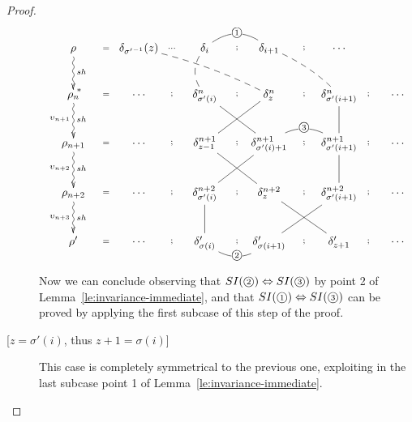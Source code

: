 \documentclass{llncs}
\newcommand{\cycl}[1]{\ensuremath{\mbox{\textcircled{\scriptsize{$#1$}}}}}
\renewcommand{\iff}{\ensuremath{\Leftrightarrow}}
\begin{document}
\begin{proof}
\begin{description}
$$\xymatrix@C=2pc@R=2pc{
 \rho  \ar@{~>}[d]^{sh}^(.9){*} \ar@{}[r]|{=} &
   \delta_{{\sigma'}^{-1}}(z)  \ar@{--}@/^1ex/[drr]   \ar@{}[r]|{\cdots}  &
    \delta_i \ar@{--}@/_2ex/[d]  \ar@{}[r]|{;} \ar@{-}@/^3ex/[r]|{\cycl{1}} &
    \delta_{i+1} \ar@{--}@/^1ex/[dr]  \ar@{}[r]|{;}  & \cdots\\
\rho_n  \ar@{~>}[d]^{sh}_{\upsilon_{n+1}}  \ar@{}[r]|{=} &
   \cdots   \ar@{}[r]|{;}  &
    \delta^n_{\sigma'(i)} \ar@{-}[dr]  \ar@{}[r]|{;}   &
   \delta^n_z \ar@{-}[dl]  \ar@{}[r]|{;} &
   \delta^n_{\sigma'(i+1)} \ar@{-}[d]  \ar@{}[r]|{;} &
    \cdots\\
  \rho_{n+1}  \ar@{~>}[d]^{sh}_{\upsilon_{n+2}}  \ar@{}[r]|{=} &
   \cdots   \ar@{}[r]|{;}  &
    \delta^{n+1}_{z-1} \ar@{-}[dr]  \ar@{}[r]|{;}   &
   \delta^{n+1}_{\sigma'(i)+1}  \ar@{-}[dl]  \ar@{}[r]|{;}   \ar@{-}@/^3ex/[r]|{\cycl{3}} &
   \delta^{n+1}_{\sigma'(i+1)} \ar@{-}[d]  \ar@{}[r]|{;} &
    \cdots\\
    \rho_{n+2}  \ar@{~>}[d]^{sh}_{\upsilon_{n+3}}  \ar@{}[r]|{=} &
   \cdots   \ar@{}[r]|{;}  &
    \delta^{n+2}_{\sigma'(i)} \ar@{-}[d]  \ar@{}[r]|{;}   &
   \delta^{n+2}_z \ar@{-}[dr]  \ar@{}[r]|{;} &
   \delta^{n+2}_{\sigma'(i+1)} \ar@{-}[dl]  \ar@{}[r]|{;} &
    \cdots\\  
\rho'  \ar@{}[r]|{=} & 
    \cdots   \ar@{}[r]|{;}  &
     \delta'_{\sigma(i)} \ar@{}[r]|{;} \ar@{-}@/_3ex/[r]|{\cycl{2}} &
    \delta'_{\sigma(i+1)}  \ar@{}[r]|{;} &
    \delta'_{z+1}  \ar@{}[r]|{;} &
     \cdots  \\
}$$

Now we can conclude observing that $SI(\cycl{2}) \iff SI(\cycl{3})$ by point 2 of Lemma~\ref{le:invariance-immediate}, and that $SI(\cycl{1}) \iff SI(\cycl{3})$ can be proved by applying the first subcase of this step of the proof.


\item   [{[$z = \sigma'(i)$, thus $z+1 = \sigma(i)$]}]  
This case is completely symmetrical to the previous one, exploiting in the last subcase point 1 of Lemma~\ref{le:invariance-immediate}. 

\end{description}

\end{proof}
\end{document}
